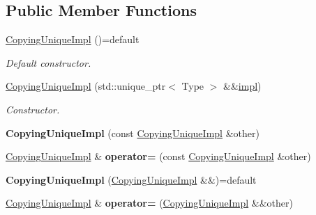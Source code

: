 \subsection*{Public Member Functions}
\begin{DoxyCompactItemize}
\item 
\hypertarget{classSpacy_1_1Mixin_1_1CopyingUniqueImpl_ad0fc9e321b82e636f0859df171142a01}{}\hyperlink{classSpacy_1_1Mixin_1_1CopyingUniqueImpl_ad0fc9e321b82e636f0859df171142a01}{Copying\+Unique\+Impl} ()=default\label{classSpacy_1_1Mixin_1_1CopyingUniqueImpl_ad0fc9e321b82e636f0859df171142a01}

\begin{DoxyCompactList}\small\item\em Default constructor. \end{DoxyCompactList}\item 
\hyperlink{classSpacy_1_1Mixin_1_1CopyingUniqueImpl_aae94252db5d9b1b13ad62cbe2fcd6086_aae94252db5d9b1b13ad62cbe2fcd6086}{Copying\+Unique\+Impl} (std\+::unique\+\_\+ptr$<$ Type $>$ \&\&\hyperlink{classSpacy_1_1Mixin_1_1CopyingUniqueImpl_ab7cc202fd000ba1753ef8596c09dc803}{impl})
\begin{DoxyCompactList}\small\item\em Constructor. \end{DoxyCompactList}\item 
\hypertarget{classSpacy_1_1Mixin_1_1CopyingUniqueImpl_a6d84fb0932af2d3f8015fae16627f37d}{}{\bfseries Copying\+Unique\+Impl} (const \hyperlink{classSpacy_1_1Mixin_1_1CopyingUniqueImpl}{Copying\+Unique\+Impl} \&other)\label{classSpacy_1_1Mixin_1_1CopyingUniqueImpl_a6d84fb0932af2d3f8015fae16627f37d}

\item 
\hypertarget{classSpacy_1_1Mixin_1_1CopyingUniqueImpl_a85a1b465406461ce461e7e67336a72d7}{}\hyperlink{classSpacy_1_1Mixin_1_1CopyingUniqueImpl}{Copying\+Unique\+Impl} \& {\bfseries operator=} (const \hyperlink{classSpacy_1_1Mixin_1_1CopyingUniqueImpl}{Copying\+Unique\+Impl} \&other)\label{classSpacy_1_1Mixin_1_1CopyingUniqueImpl_a85a1b465406461ce461e7e67336a72d7}

\item 
\hypertarget{classSpacy_1_1Mixin_1_1CopyingUniqueImpl_a513e88451b85b40b9f0ac0012e5adf41}{}{\bfseries Copying\+Unique\+Impl} (\hyperlink{classSpacy_1_1Mixin_1_1CopyingUniqueImpl}{Copying\+Unique\+Impl} \&\&)=default\label{classSpacy_1_1Mixin_1_1CopyingUniqueImpl_a513e88451b85b40b9f0ac0012e5adf41}

\item 
\hypertarget{classSpacy_1_1Mixin_1_1CopyingUniqueImpl_a9f79e3b36b5df2be63025629213dc9d7}{}\hyperlink{classSpacy_1_1Mixin_1_1CopyingUniqueImpl}{Copying\+Unique\+Impl} \& {\bfseries operator=} (\hyperlink{classSpacy_1_1Mixin_1_1CopyingUniqueImpl}{Copying\+Unique\+Impl} \&\&other)\label{classSpacy_1_1Mixin_1_1CopyingUniqueImpl_a9f79e3b36b5df2be63025629213dc9d7}


\end{DoxyCompactItemize}
